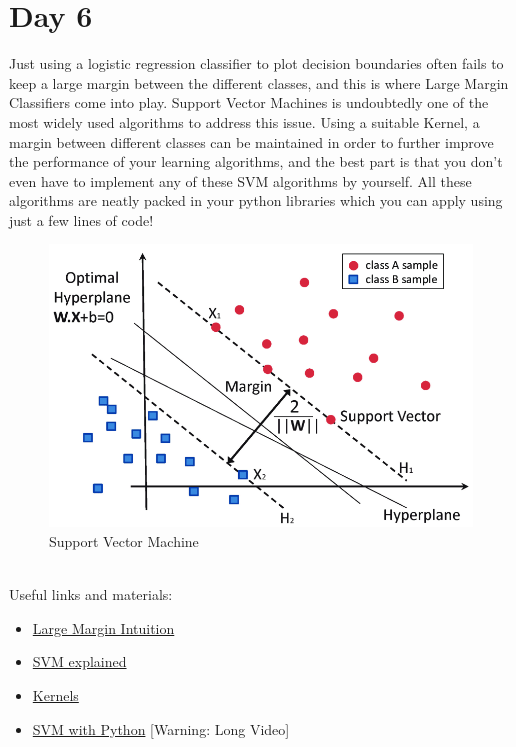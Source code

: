 \documentclass[11pt]{article}
\begin{document}
\section{Day 6}
Just using a logistic regression classifier to plot decision boundaries often fails to keep a large margin between the different classes, and this is where Large Margin Classifiers come into play. Support Vector Machines is undoubtedly one of the most widely used algorithms to address this issue. Using a suitable Kernel, a margin between different classes can be maintained in order to further improve the performance of your learning algorithms, and the best part is that you don't even have to implement any of these SVM algorithms by yourself. All these algorithms are neatly packed in your python libraries which you can apply using just a few lines of code!
\begin{figure}[h!]
\begin{center}
\includegraphics[scale=.45]{img/svm.png}
{\caption*{Support Vector Machine}}
\end{center}
\end{figure}\\
Useful links and materials:
\begin{itemize}
\item \href{https://www.youtube.com/watch?v=Ccje1EzrXBU}{Large Margin Intuition}
\item \href{https://www.youtube.com/watch?v=efR1C6CvhmE}{SVM explained}
\item \href{https://www.youtube.com/watch?v=mTyT-oHoivA}{Kernels}
\item \href{https://www.youtube.com/watch?v=7sz4WpkUIIs}{SVM with Python} [Warning: Long Video]
\end{itemize}
\pagebreak
\end{document}
